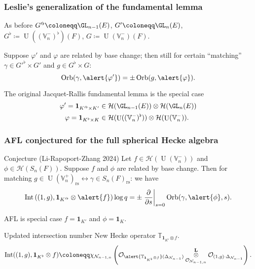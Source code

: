 \documentclass[11pt]{beamer}
\DeclareMathOperator{\Int}{Int}
\DeclareMathOperator{\Orb}{Orb}
\DeclareMathOperator{\U}{U}
\newcommand{\HH}{\mathcal{H}}
\newcommand{\VV}{\mathbb{V}}
\newcommand{\TT}{\mathbb{T}}
\newcommand{\RZ}{\mathcal{N}}
\newcommand{\Sheaf}{\mathcal O}
\newcommand{\jiao}{\mathop{\otimes}^{\mathbf{L}}} %
\newcommand{\rs}{_{\text{rs}}}
\begin{document}
\begin{frame}
  \frametitle{Leslie's generalization of the fundamental lemma}
  As before $G'^\flat \coloneqq \GL_{n-1}(E)$, $G' \coloneqq \GL_n(E)$,
  $G^\flat \coloneqq \U((\VV_n^-)^\flat)(F)$, $G \coloneqq \U(\VV_n^-)(F)$.

  \begin{theorem}[Leslie 2023]
    Suppose \alert{$\varphi'$ and $\varphi$ are related by base change}; then still
    for certain ``matching'' $\gamma \in G'^\flat \times G'$ and $g \in G^\flat \times G$:
    \[ \Orb(\gamma, \alert{\varphi'}) = \pm \Orb(g, \alert{\varphi}). \]
  \end{theorem}

  The original Jacquet-Rallis fundamental lemma is the special case
  \begin{align*}
    \varphi' = \mathbf{1}_{K'^\flat \times K'} &\in \HH(\GL_{n-1}(E)) \otimes \HH(\GL_n(E)) \\
    \varphi = \mathbf{1}_{K^\flat \times K} &\in \HH(\U((\VV_n^-)^\flat)) \otimes \HH(\U(\VV_n^-)).
  \end{align*}
\end{frame}

\begin{frame}
  \frametitle{AFL conjectured for the full spherical Hecke algebra}
  \begin{exampleblock}{Conjecture (Li-Rapoport-Zhang 2024)}
    Let \alert{$f \in \HH(\U(\VV_n^-))$} and \alert{$\phi \in \HH(S_n(F))$}.
    Suppose \alert{$f$ and $\phi$ are related by base change}.
    Then for matching $g \in \U(\VV_n^+)\rs \longleftrightarrow \gamma \in S_n(F)\rs$:
    we have
    \[ \Int\left( (1,g), \mathbf{1}_{K'^\flat} \otimes \alert{f} \right) \log q
    = \pm \left. \pdv{}{s} \right\rvert_{s=0} \Orb(\gamma, \alert{\phi}, s). \]
  \end{exampleblock}
  AFL is special case $f = \mathbf{1}_{K'}$ and $\phi = \mathbf{1}_K$.
  \begin{block}{Updated intersection number}
    New Hecke operator $\TT_{\mathbf{1}_{K^\flat} \otimes f}$.
    \[
      \Int((1,g), \mathbf{1}_{K^\flat} \otimes f)
      \coloneqq \chi_{\RZ_{n-1,n}} \left(
        \Sheaf_{\alert{\TT_{\mathbf{1}_{K^\flat} \otimes f}} (\Delta_{\RZ_{n-1}})}
        \jiao_{\Sheaf_{\RZ_{n-1,n}}} \Sheaf_{(1,g) \cdot \Delta_{\RZ_{n-1}}} \right).
    \]
  \end{block}
\end{frame}
\end{document}
